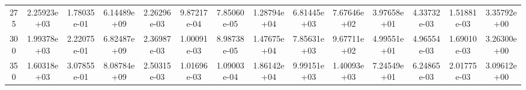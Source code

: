 \documentclass[
prb,
twocolumn,
superscriptaddress,
 amsmath,amssymb,
 aps,
longbibliography,
]{revtex4-2}
\begin{document}
\begin{table}[htbp!]
{\begin{tabular}{cccccccccccccc}
275 & 2.25923e+03 & 1.78035e-01 & 6.14489e+09 & 2.26296e-03 & 9.87217e-04 & 7.85060e-05 & 1.28794e+04 & 6.81445e+03 & 7.67646e+02 & 3.97658e+01 & 4.33732e-03 & 1.51881e-03 & 3.35792e+00 \\
300 & 1.99378e+03 & 2.22075e-01 & 6.82487e+09 & 2.36987e-03 & 1.00091e-03 & 8.98738e-05 & 1.47675e+04 & 7.85631e+03 & 9.67711e+02 & 4.99551e+01 & 4.96554e-03 & 1.69010e-03 & 3.26300e+00 \\
350 & 1.60318e+03 & 3.07855e-01 & 8.08784e+09 & 2.50315e-03 & 1.01696e-03 & 1.09003e-04 & 1.86142e+04 & 9.99151e+03 & 1.40093e+03 & 7.24549e+01 & 6.24865e-03 & 2.01775e-03 & 3.09612e+00 \\
\hline
  \end{tabular}
  }
\end{table}


\begin{table}[htbp!]
  \caption{Parameters entering the viscous heat equations for isotopically purified graphite (99.9 \% $^{12}$C, 0.1 \% $^{13}$C). We report here only the in-plane components of the tensors needed to perform the calculations:
 $\kappa^{ij}_{\rm P}=\kappa_{\rm P}\delta^{ij}$, $\kappa^{ij}_{\rm C}=\kappa_{\rm C}\delta^{ij}$, $K^{ij}_{S}=K_{S}\delta^{ij}$, ${D}_{U}^{ij}={D}_{U}\delta^{ij}$, $A=A^i\;\forall \;i$, $W^j_{0i}=W^j_{i0}= W\delta^{ij}$, where the indexes $i,j$ represent the in-plane directions $x,y$ only ($i,j=1,2$ and $i\neq j$).}
  \label{tab:param_graphite}
  \centering
{}
\end{table}
\end{document}
